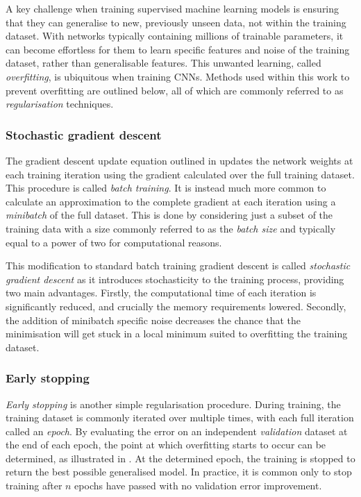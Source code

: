 A key challenge when training supervised machine learning models is ensuring that they can
generalise to new, previously unseen data, not within the training dataset. With networks
typically containing millions of trainable parameters, it can become effortless for them to learn
specific features and noise of the training dataset, rather than generalisable features. This
unwanted learning, called \emph{overfitting}, is ubiquitous when training CNNs. Methods used
within this work to prevent overfitting are outlined below, all of which are commonly referred to
as \emph{regularisation} techniques.

\subsubsection*{Stochastic gradient descent} %

The gradient descent update equation outlined in  updates the network
weights at each training iteration using the gradient calculated over the full training dataset.
This procedure is called \emph{batch training}. It is instead much more common to calculate an
approximation to the complete gradient at each iteration using a \emph{minibatch} of the full
dataset. This is done by considering just a subset of the training data with a size commonly
referred to as the \emph{batch size} and typically equal to a power of two for computational
reasons.

This modification to standard batch training gradient descent is called \emph{stochastic gradient
    descent} as it introduces stochasticity to the training process, providing two main
    advantages. Firstly, the computational time of each iteration is significantly reduced, and
    crucially the memory requirements lowered. Secondly, the addition of minibatch specific noise
    decreases the chance that the minimisation will get stuck in a local minimum suited to
    overfitting the training dataset.

\subsubsection*{Early stopping} %

\emph{Early stopping} is another simple regularisation procedure. During training, the training
dataset is commonly iterated over multiple times, with each full iteration called an \emph{epoch}.
By evaluating the error on an independent \emph{validation} dataset at the end of each epoch, the
point at which overfitting starts to occur can be determined, as illustrated in
. At the determined epoch, the training is stopped to return the
best possible generalised model. In practice, it is common only to stop training after $n$ epochs
have passed with no validation error improvement.


